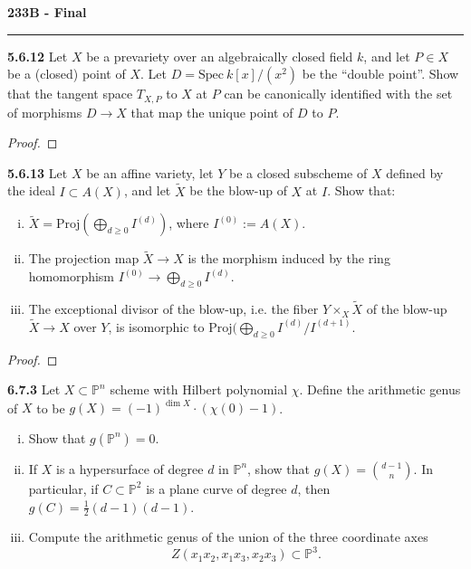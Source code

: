 \documentclass[11pt,letterpaper]{report}
\newcommand{\projective}{\mathbb{P}}
\newcommand{\Spec}{\text{Spec}}
\newcommand{\Proj}{\text{Proj}}
\begin{document}
\begin{center}
{\bf \Large 233B - Final} %
\vspace{0.2cm}
\hrule
\end{center}

\noindent\textbf{5.6.12}
Let $X$ be a prevariety over an algebraically closed field $k$, and let $P\in X$ be a (closed) point of $X$. Let $D = \Spec\ k[x]/(x^2)$ be the ``double point''. Show that the tangent space $T_{X,P}$ to $X$ at $P$ can be canonically identified with the set of morphisms $D\to X$ that map the unique point of $D$ to $P$.
\begin{proof}
	
\end{proof}

\noindent\textbf{5.6.13}
Let $X$ be an affine variety, let $Y$ be a closed subscheme of $X$ defined by the ideal $I\subset A(X)$, and let $\tilde{X}$ be the blow-up of $X$ at $I$. Show that:
\begin{enumerate}[(i)]
	\item $\tilde{X} = \Proj(\bigoplus_{d\geq 0}I^{(d)})$, where $I^{(0)}:= A(X)$.
	\item The projection map $\tilde{X}\to X$ is the morphism induced by the ring homomorphism $I^{(0)}\to \bigoplus_{d\geq 0}I^{(d)}$.
	\item The exceptional divisor of the blow-up, i.e. the fiber $Y\times_X\tilde{X}$ of the blow-up $\tilde{X}\to X$ over $Y$, is isomorphic to $\Proj(\bigoplus_{d\geq 0}I^{(d)}/I^{(d+1)}$.
\end{enumerate}
\begin{proof}
	
\end{proof}


\noindent\textbf{6.7.3}
Let $X\subset \projective^n$ scheme with Hilbert polynomial $\chi$. Define the arithmetic genus of $X$ to be $g(X) = (-1)^{\dim X}\cdot (\chi(0)-1)$.
\begin{enumerate}[(i)]
	\item Show that $g(\projective^n) = 0$.
	\item If $X$ is a hypersurface of degree $d$ in $\projective^n$, show that $g(X) = \binom{d-1}{n}$. In particular, if $C\subset \projective^2$ is a plane curve of degree $d$, then $g(C) = \frac{1}{2}(d-1)(d-1)$.
	\item Compute the arithmetic genus of the union of the three coordinate axes
	\[
	Z(x_1x_2, x_1x_3, x_2x_3)\subset \projective^3.
	\]
\end{enumerate}
\end{document}
